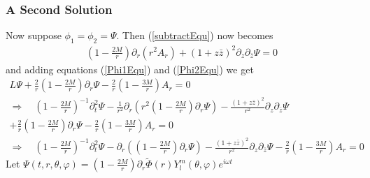 \documentclass[12pt]{article}
\def\nn{\nonumber}
\begin{document}
\subsubsection{A Second Solution}
Now suppose $\phi_{1} = \phi_{2} = \Psi$. Then (\ref{subtractEqu}) now becomes
\begin{gather}
(1 - \frac{2 M}{r})
\partial_{r}(r^{2} A_{r})
+
(1 + z \bar{z})^{2}
\partial_{z}\partial_{\bar{z}}\Psi
=0
\end{gather}
and adding equations (\ref{Phi1Equ}) and (\ref{Phi2Equ}) we get
\begin{gather}
L \Psi
+
\frac{2}{r}
(1 - \frac{2 M}{r})
\partial_{r}\Psi
-
\frac{2}{r}
\left(
1
-
\frac{3 M}{r}
\right)
A_{r}
=0
\nn \\
\Rightarrow
\quad
(1 - \frac{2 M}{r})^{-1} \partial^{2}_{t}
\Psi
-
\frac{1}{r^{2}}
\partial_{r}
\left(
r^{2}
(1 - \frac{2 M}{r})
\partial_{r} \Psi
\right)
-
\frac{(1 + z \bar{z})^{2}}{r^{2}}
\partial_{z}
\partial_{\bar{z}}
\Psi
\nn \\
+
\frac{2}{r}
(1 - \frac{2 M}{r})
\partial_{r}\Psi
-
\frac{2}{r}
\left(
1
-
\frac{3 M}{r}
\right)
A_{r}
=0
\nn \\
\Rightarrow
\quad
(1 - \frac{2 M}{r})^{-1} \partial^{2}_{t}
\Psi
-
\partial_{r}
\left(
(1 - \frac{2 M}{r})
\partial_{r} \Psi
\right)
-
\frac{(1 + z \bar{z})^{2}}{r^{2}}
\partial_{z}
\partial_{\bar{z}}
\Psi
-
\frac{2}{r}
\left(
1
-
\frac{3 M}{r}
\right)
A_{r}
=0
\end{gather}
Let $\Psi(t,r,\theta,\varphi) = (1 - \frac{2 M}{r}) \partial_{r}\tilde{\Phi}(r) Y_{l}^{m}(\theta,\varphi) e^{i \omega t}$
\end{document}
